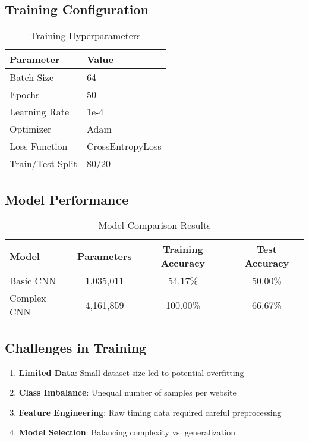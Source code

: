 \documentclass[11pt,a4paper]{article}
\begin{document}
\subsection{Training Configuration}
\begin{table}[H]
\centering
\caption{Training Hyperparameters}
\label{tab:training}
\begin{tabular}{@{}ll@{}}
\toprule
Parameter & Value \\
\midrule
Batch Size & 64 \\
Epochs & 50 \\
Learning Rate & 1e-4 \\
Optimizer & Adam \\
Loss Function & CrossEntropyLoss \\
Train/Test Split & 80/20 \\
\bottomrule
\end{tabular}
\end{table}

\subsection{Model Performance}
\begin{table}[H]
\centering
\caption{Model Comparison Results}
\label{tab:results}
\begin{tabular}{@{}lccc@{}}
\toprule
Model & Parameters & Training Accuracy & Test Accuracy \\
\midrule
Basic CNN & 1,035,011 & 54.17\% & 50.00\% \\
Complex CNN & 4,161,859 & 100.00\% & 66.67\% \\
\bottomrule
\end{tabular}
\end{table}

\subsection{Challenges in Training}
\begin{enumerate}
    \item \textbf{Limited Data}: Small dataset size led to potential overfitting
    \item \textbf{Class Imbalance}: Unequal number of samples per website
    \item \textbf{Feature Engineering}: Raw timing data required careful preprocessing
    \item \textbf{Model Selection}: Balancing complexity vs. generalization
\end{enumerate}
\end{document}
